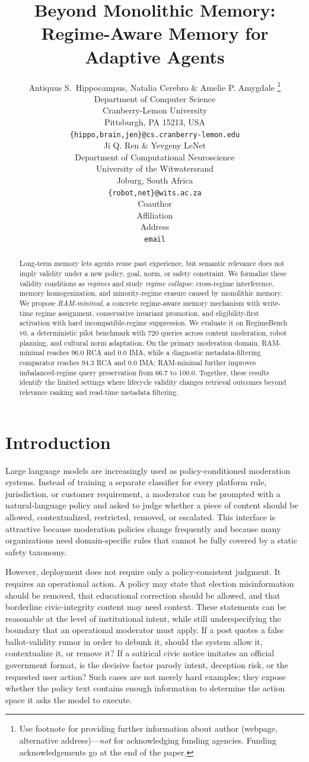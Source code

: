 \documentclass{article} %
\title{Beyond Monolithic Memory: Regime-Aware Memory for Adaptive Agents}
\author{Antiquus S.~Hippocampus, Natalia Cerebro \& Amelie P. Amygdale \thanks{ Use footnote for providing further information
about author (webpage, alternative address)---\emph{not} for acknowledging
funding agencies.  Funding acknowledgements go at the end of the paper.} \\
Department of Computer Science\\
Cranberry-Lemon University\\
Pittsburgh, PA 15213, USA \\
\texttt{\{hippo,brain,jen\}@cs.cranberry-lemon.edu} \\
\And
Ji Q. Ren \& Yevgeny LeNet \\
Department of Computational Neuroscience \\
University of the Witwatersrand \\
Joburg, South Africa \\
\texttt{\{robot,net\}@wits.ac.za} \\
\AND
Coauthor \\
Affiliation \\
Address \\
\texttt{email}
}
\begin{document}
\maketitle

\begin{abstract}
Long-term memory lets agents reuse past experience, but semantic relevance does not imply validity under a new policy, goal, norm, or safety constraint.
We formalize these validity conditions as \emph{regimes} and study \emph{regime collapse}: cross-regime interference, memory homogenization, and minority-regime erasure caused by monolithic memory.
We propose \emph{RAM-minimal}, a concrete regime-aware memory mechanism with write-time regime assignment, conservative invariant promotion, and eligibility-first activation with hard incompatible-regime suppression.
We evaluate it on RegimeBench v0, a deterministic pilot benchmark with 720 queries across content moderation, robot planning, and cultural norm adaptation.
On the primary moderation domain, RAM-minimal reaches 96.0 RCA and 0.0 IMA, while a diagnostic metadata-filtering comparator reaches 94.3 RCA and 0.0 IMA; RAM-minimal further improves imbalanced-regime query preservation from 66.7 to 100.0.
Together, these results identify the limited settings where lifecycle validity changes retrieval outcomes beyond relevance ranking and read-time metadata filtering.
\end{abstract}
\section{Introduction}

Large language models are increasingly used as policy-conditioned moderation
systems. Instead of training a separate classifier for every platform rule,
jurisdiction, or customer requirement, a moderator can be prompted with a
natural-language policy and asked to judge whether a piece of content should be
allowed, contextualized, restricted, removed, or escalated. This interface is
attractive because moderation policies change frequently and because many
organizations need domain-specific rules that cannot be fully covered by a
static safety taxonomy.

However, deployment does not require only a policy-consistent judgment. It
requires an operational action. A policy may state that election misinformation
should be removed, that educational correction should be allowed, and that
borderline civic-integrity content may need context. These statements can be
reasonable at the level of institutional intent, while still underspecifying the
boundary that an operational moderator must apply. If a post quotes a false
ballot-validity rumor in order to debunk it, should the system allow it,
contextualize it, or remove it? If a satirical civic notice imitates an official
government format, is the decisive factor parody intent, deception risk, or the
requested user action? Such cases are not merely hard examples; they expose
whether the policy text contains enough information to determine the action
space it asks the model to execute.
\end{document}
